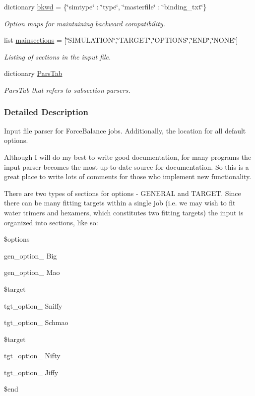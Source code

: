 \begin{DoxyCompactItemize}
dictionary \hyperlink{namespaceforcebalance_1_1parser_a37193d7ceabbf07a61e65677372b7dab}{bkwd} = \{\char`\"{}simtype\char`\"{} \-: \char`\"{}type\char`\"{}, \char`\"{}masterfile\char`\"{} \-: \char`\"{}binding\-\_\-txt\char`\"{}\}
\begin{DoxyCompactList}\small\item\em \-Option maps for maintaining backward compatibility. \end{DoxyCompactList}\item 
list \hyperlink{namespaceforcebalance_1_1parser_a525ac339b645dbfb9fbb7cc672712504}{mainsections} = \mbox{[}\char`\"{}\-S\-I\-M\-U\-L\-A\-T\-I\-O\-N\char`\"{},\char`\"{}\-T\-A\-R\-G\-E\-T\char`\"{},\char`\"{}\-O\-P\-T\-I\-O\-N\-S\char`\"{},\char`\"{}\-E\-N\-D\char`\"{},\char`\"{}\-N\-O\-N\-E\char`\"{}\mbox{]}
\begin{DoxyCompactList}\small\item\em \-Listing of sections in the input file. \end{DoxyCompactList}\item 
dictionary \hyperlink{namespaceforcebalance_1_1parser_af0a8dc5cdc54cc88ded3ee3b46d71672}{\-Pars\-Tab}
\begin{DoxyCompactList}\small\item\em \-Pars\-Tab that refers to subsection parsers. \end{DoxyCompactList}\end{DoxyCompactItemize}


\subsubsection{\-Detailed \-Description}
\-Input file parser for \-Force\-Balance jobs. \-Additionally, the location for all default options.

\-Although \-I will do my best to write good documentation, for many programs the input parser becomes the most up-\/to-\/date source for documentation. \-So this is a great place to write lots of comments for those who implement new functionality.

\-There are two types of sections for options -\/ \-G\-E\-N\-E\-R\-A\-L and \-T\-A\-R\-G\-E\-T. \-Since there can be many fitting targets within a single job (i.\-e. we may wish to fit water trimers and hexamers, which constitutes two fitting targets) the input is organized into sections, like so\-:

\$options\par
 gen\-\_\-option\-\_ \-Big\par
 gen\-\_\-option\-\_ \-Mao\par
 \$target\par
 tgt\-\_\-option\-\_ \-Sniffy\par
 tgt\-\_\-option\-\_ \-Schmao\par
 \$target\par
 tgt\-\_\-option\-\_ \-Nifty\par
 tgt\-\_\-option\-\_ \-Jiffy\par
 \$end

